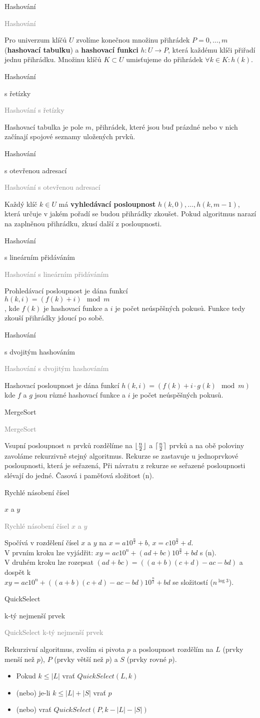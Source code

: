 \documentclass[20pt]{extarticle}
\newcommand{\card}[3][]{
	\vspace*{\fill}

	\newpage
	\topskip0pt
	\vspace*{\fill}
		\Large #2

		\vspace{1cm}
		\normalsize #1
	\vspace*{\fill}
	\newpage

	\small \textcolor{gray}{#2 #1}
	\topskip0pt
	\vspace*{\fill}

	\normalsize
	#3
	\vspace*{\fill}
}
\DeclarePairedDelimiter{\ceil}{\lceil}{\rceil}
\DeclarePairedDelimiter{\floor}{\lfloor}{\rfloor}
\begin{document}
\begin{center}
\card{Hashování}{
	Pro univerzum klíčů $U$ zvolíme konečnou množinu přihrádek $P={0, \dots, m}$
	(\textbf{hashovací tabulku}) a \textbf{hashovací funkci} $h: U \to P$, která
	každému klíči přiřadí jednu přihrádku. Množinu klíčů $K \subset U$ umisťujeme
	do přihrádek $\forall k \in K: h(k)$.
}

\card[s řetízky]{Hashování}{
	Hashovací tabulka je pole $m$, přihrádek, které jsou buď prázdné nebo v nich
	začínají spojové seznamy uložených prvků.
}

\card[s otevřenou adresací]{Hashování}{
	Každý klíč $k \in U$ má \textbf{vyhledávací posloupnost} $h(k, 0), \dots, h(k, m-1)$,
	která určuje v jakém pořadí se budou přihrádky zkoušet. Pokud algoritmus narazí
	na zaplněnou přihrádku, zkusí další z posloupnosti.
}

\card[s lineárním přidáváním]{Hashování}{
	Prohledávací posloupnost je dána funkcí\\
	$h(k, i) = (f(k) + i) \mod m$\\, kde
	$f(k)$ je hashovací funkce a $i$ je počet neúspěšných pokusů. Funkce tedy zkouší
	přihrádky jdoucí po sobě.
}

\card[s dvojitým hashováním]{Hashování}{
	Hashovací posloupnost je dána funkcí $h(k, i) = (f(k) + i \cdot g(k) \mod m)$
	kde $f$ a $g$ jsou různé hashovací funkce a $i$ je počet neúspěšných pokusů.
}

\card{MergeSort}{
	Vsupní posloupnost $n$ prvků rozdělíme na $\floor{\frac{n}{2}}$ a $\ceil{\frac{n}{2}}$
	prvků a na obě poloviny zavoláme rekurzivně stejný algoritmus. Rekurze se zastavuje
	u jednoprvkové posloupnosti, která je seřazená, Při návratu z rekurze se seřazené
	posloupnosti slévají do jedné. Časová i paměťová složitost \Theta(n).
}

\card[$x$ a $y$]{Rychlé násobení čísel}{
	Spočívá v rozdělení čísel $x$ a $y$ na $x=a10^{\frac{n}{2}} + b$, $x=c10^{\frac{n}{2}} + d$.\\
	V prvním kroku lze vyjádřit: $xy = ac10^n + (ad + bc)10^{\frac{n}{2}} + bd$ s \Theta(n).\\
	V druhém kroku lze rozepsat $(ad + bc) = ((a+b)(c+d) - ac - bd)$ a dospět k\\
	$xy = ac10^n + ((a+b)(c+d) - ac - bd)10^{\frac{n}{2}} + bd$ se složitostí \Theta($n^{\log 3}$).
}

\card[k-tý nejmenší prvek]{QuickSelect}{
	\small
	Rekurzivní algoritmus, zvolím si pivota $p$ a posloupnost rozdělím na $L$ (prvky menší
	než $p$), $P$ (prvky větší než $p$) a $S$ (prvky rovné $p$).
	\begin{itemize}
		\item Pokud $k \leq |L|$ vrať $QuickSelect(L, k)$
		\item (nebo) je-li $k \leq |L|+|S|$ vrať $p$
		\item (nebo) vrať $QuickSelect(P, k-|L|-|S|)$
	\end{itemize}
}


\end{center}
\end{document}
